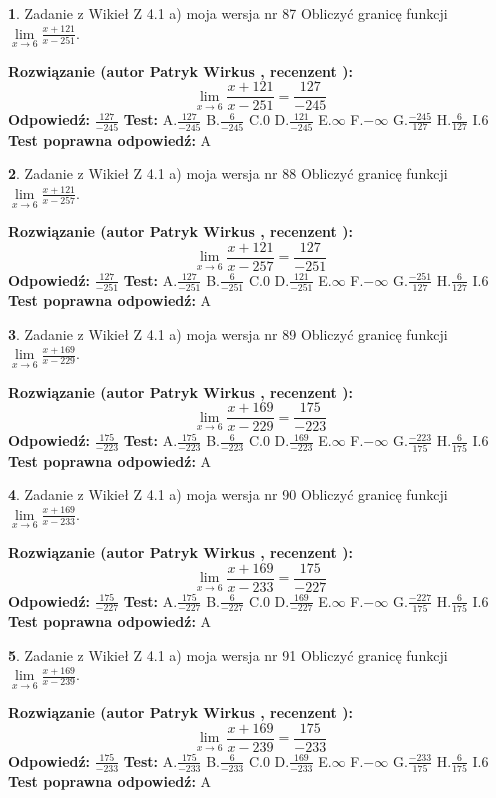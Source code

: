 \documentclass[12pt, a4paper]{article}
\theoremstyle{definition} %
\newtheorem{zad}{}
\newcommand{\zadStart}[1]{\begin{zad}#1\newline}
\newcommand{\zadStop}{\end{zad}}
\newcommand{\rozwStart}[2]{\noindent \textbf{Rozwiązanie (autor #1 , recenzent #2): }\newline}
\newcommand{\rozwStop}{\newline}
\newcommand{\odpStart}{\noindent \textbf{Odpowiedź:}\newline}
\newcommand{\odpStop}{\newline}
\newcommand{\testStart}{\noindent \textbf{Test:}\newline}
\newcommand{\testStop}{\newline}
\newcommand{\kluczStart}{\noindent \textbf{Test poprawna odpowiedź:}\newline}
\newcommand{\kluczStop}{\newline}
\begin{document}
\zadStart{Zadanie z Wikieł Z 4.1 a) moja wersja nr 87}
Obliczyć granicę funkcji $\lim\limits_{x\to6}\frac{x+121}{x-251}$.
\zadStop
\rozwStart{Patryk Wirkus}{}
$$\lim\limits_{x\to6}\frac{x+121}{x-251} = \frac{127}{-245}$$
\rozwStop
\odpStart
$\frac{127}{-245}$
\odpStop
\testStart
A.$\frac{127}{-245}$
B.$\frac{6}{-245}$
C.$0$
D.$\frac{121}{-245}$
E.$\infty$
F.$-\infty$
G.$\frac{-245}{127}$
H.$\frac{6}{127}$
I.$6$
\testStop
\kluczStart
A
\kluczStop



\zadStart{Zadanie z Wikieł Z 4.1 a) moja wersja nr 88}
Obliczyć granicę funkcji $\lim\limits_{x\to6}\frac{x+121}{x-257}$.
\zadStop
\rozwStart{Patryk Wirkus}{}
$$\lim\limits_{x\to6}\frac{x+121}{x-257} = \frac{127}{-251}$$
\rozwStop
\odpStart
$\frac{127}{-251}$
\odpStop
\testStart
A.$\frac{127}{-251}$
B.$\frac{6}{-251}$
C.$0$
D.$\frac{121}{-251}$
E.$\infty$
F.$-\infty$
G.$\frac{-251}{127}$
H.$\frac{6}{127}$
I.$6$
\testStop
\kluczStart
A
\kluczStop



\zadStart{Zadanie z Wikieł Z 4.1 a) moja wersja nr 89}
Obliczyć granicę funkcji $\lim\limits_{x\to6}\frac{x+169}{x-229}$.
\zadStop
\rozwStart{Patryk Wirkus}{}
$$\lim\limits_{x\to6}\frac{x+169}{x-229} = \frac{175}{-223}$$
\rozwStop
\odpStart
$\frac{175}{-223}$
\odpStop
\testStart
A.$\frac{175}{-223}$
B.$\frac{6}{-223}$
C.$0$
D.$\frac{169}{-223}$
E.$\infty$
F.$-\infty$
G.$\frac{-223}{175}$
H.$\frac{6}{175}$
I.$6$
\testStop
\kluczStart
A
\kluczStop



\zadStart{Zadanie z Wikieł Z 4.1 a) moja wersja nr 90}
Obliczyć granicę funkcji $\lim\limits_{x\to6}\frac{x+169}{x-233}$.
\zadStop
\rozwStart{Patryk Wirkus}{}
$$\lim\limits_{x\to6}\frac{x+169}{x-233} = \frac{175}{-227}$$
\rozwStop
\odpStart
$\frac{175}{-227}$
\odpStop
\testStart
A.$\frac{175}{-227}$
B.$\frac{6}{-227}$
C.$0$
D.$\frac{169}{-227}$
E.$\infty$
F.$-\infty$
G.$\frac{-227}{175}$
H.$\frac{6}{175}$
I.$6$
\testStop
\kluczStart
A
\kluczStop



\zadStart{Zadanie z Wikieł Z 4.1 a) moja wersja nr 91}
Obliczyć granicę funkcji $\lim\limits_{x\to6}\frac{x+169}{x-239}$.
\zadStop
\rozwStart{Patryk Wirkus}{}
$$\lim\limits_{x\to6}\frac{x+169}{x-239} = \frac{175}{-233}$$
\rozwStop
\odpStart
$\frac{175}{-233}$
\odpStop
\testStart
A.$\frac{175}{-233}$
B.$\frac{6}{-233}$
C.$0$
D.$\frac{169}{-233}$
E.$\infty$
F.$-\infty$
G.$\frac{-233}{175}$
H.$\frac{6}{175}$
I.$6$
\testStop
\kluczStart
A
\kluczStop
\end{document}
